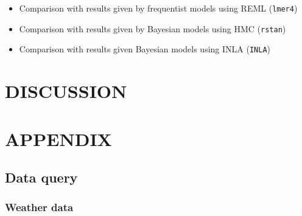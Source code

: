 \documentclass[12pt]{book}
\numberwithin{equation}{chapter}
\providecommand{\tightlist}{%
  \setlength{\itemsep}{0pt}\setlength{\parskip}{0pt}}
\begin{document}
\begin{itemize}
\tightlist
\item
  Comparison with results given by frequentist models using REML (\texttt{lmer4})
\item
  Comparison with results given by Bayesian models using HMC (\texttt{rstan})
\item
  Comparison with results given Bayesian models using INLA (\texttt{INLA})
\end{itemize}

\hypertarget{discussion}{%
\chapter{DISCUSSION}\label{discussion}}

\singlespacing

\hypertarget{appendix}{%
\chapter*{APPENDIX}\label{appendix}}

\hypertarget{dataquery}{%
\section*{Data query}\label{dataquery}}

\hypertarget{weatherdat}{%
\subsection*{Weather data}\label{weatherdat}}
\end{document}
